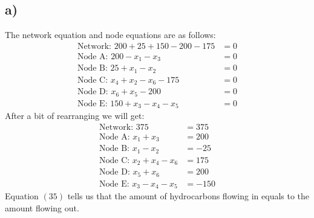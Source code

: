 \documentclass[11pt]{article}
\begin{document}
\subsection{a)}
The network equation and node equations are as follows:
\begin{align*}
\text{Network: }200+25+150-200-175&=0 \\
\text{Node A: }200-x_1-x_3&=0 \\
\text{Node B: }25+x_1-x_2&=0 \\
\text{Node C: }x_4+x_2-x_6-175&=0 \\
\text{Node D: }x_6+x_5-200&=0 \\
\text{Node E: }150+x_3-x_4-x_5&=0
\end{align*}
After a bit of rearranging we will get:
\begin{align}
\text{Network: }375&=375 \\
\text{Node A: }x_1+x_3&=200 \\
\text{Node B: }x_1-x_2&=-25 \\
\text{Node C: }x_2+x_4-x_6&=175 \\
\text{Node D: }x_5+x_6&=200 \\
\text{Node E: }x_3-x_4-x_5&=-150
\end{align}
Equation $(35)$ tells us that the amount of hydrocarbons flowing in equals to the amount flowing out.
\end{document}
